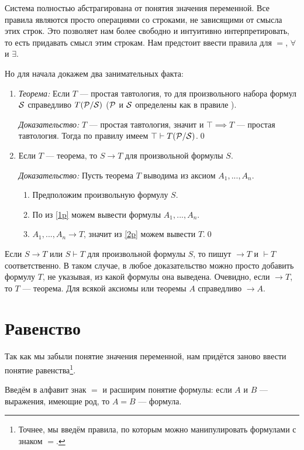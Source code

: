 Система полностью абстрагирована от понятия значения переменной.
Все правила являются просто операциями со строками, не зависящими от смысла
этих строк. Это позволяет нам более свободно и интуитивно интерпретировать, то
есть придавать смысл этим строкам.
Нам предстоит ввести правила для $=$, $\forall$ и $\exists$.

Но для начала докажем два занимательных факта:

\begin{enumerate}
	\item{}{\it Теорема:}
	Если $T$ --- простая тавтология, то
	для произвольного набора формул $\mathcal S$ справедливо $T(\mathcal P/\mathcal S)$
	($\mathcal P$ и $\mathcal S$ определены как в правиле \taut{}).

		{\it Доказательство:}
	$T$ --- простая тавтология, значит и
	${\top\implies T}$ --- простая тавтология. Тогда по правилу \taut{} имеем
	$\top\vdash T(\mathcal P/\mathcal S)$.\qed

	\item{}Если $T$ --- теорема, то $S\to T$ для произвольной формулы $S$.

		{\it Доказательство:}
	Пусть теорема $T$ выводима из аксиом $A_1,...,A_{n}$.
	\begin{enumerate}[label=(\roman*)]
		\item{}\label{1p}Предположим произвольную формулу $S$.
		\item{}\label{2p}По \axiom{} из \ref{1p} можем вывести
		формулы $A_1,...,A_{n}$.
		\item{}\label{3p}$A_1,...,A_{n}\to T$, значит из \ref{2p} можем вывести $T$.\qed
	\end{enumerate}
\end{enumerate}

Если $S\to T$ или $S\vdash T$ для произвольной формулы $S$,
то пишут $\to T$ и $\vdash T$ соответственно. В таком случае,
в любое доказательство можно просто добавить формулу $T$,
не указывая, из какой формулы она выведена. Очевидно,
если $\to T$, то $T$ --- теорема. Для всякой аксиомы или теоремы $A$
справедливо $\to A$.

\section{Равенство}

Так как мы забыли понятие значения переменной,
нам придётся заново ввести понятие равенства\footnote{
	Точнее, мы введём правила, по которым можно манипулировать
	формулами с знаком $=$.
}.

Введём в алфавит знак $=$ и расширим понятие формулы: если $A$ и $B$ --- выражения,
имеющие род, то $A=B$ --- формула.

